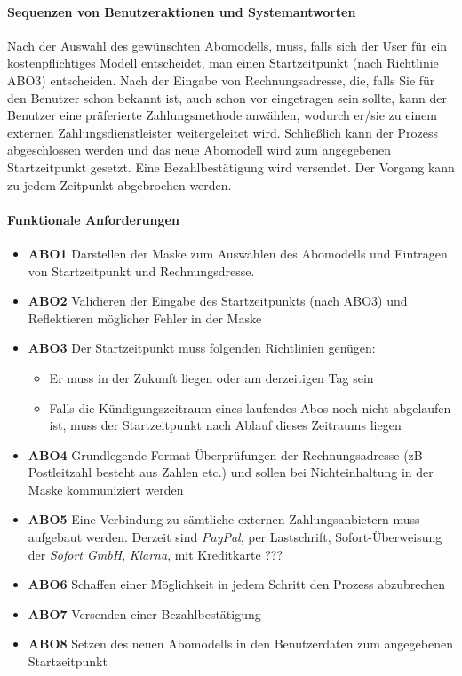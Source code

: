 \paragraph{Sequenzen von Benutzeraktionen und Systemantworten}
Nach der Auswahl des gewünschten Abomodells, muss, falls sich der User für ein kostenpflichtiges Modell entscheidet, man einen Startzeitpunkt (nach Richtlinie ABO3) entscheiden. Nach der Eingabe von Rechnungsadresse, die, falls Sie für den Benutzer schon bekannt ist, auch schon vor eingetragen sein sollte, kann der Benutzer eine präferierte Zahlungsmethode anwählen, wodurch er/sie zu einem externen Zahlungsdienstleister weitergeleitet wird. Schließlich kann der Prozess abgeschlossen werden und das neue Abomodell wird zum angegebenen Startzeitpunkt gesetzt. Eine Bezahlbestätigung wird versendet. Der Vorgang kann zu jedem Zeitpunkt abgebrochen werden.

\paragraph{Funktionale Anforderungen}
\begin{itemize}
	\item \textbf{ABO1} Darstellen der Maske zum Auswählen des Abomodells und Eintragen von Startzeitpunkt und Rechnungsdresse.
	\item \textbf{ABO2} Validieren der Eingabe des Startzeitpunkts (nach ABO3) und Reflektieren möglicher Fehler in der Maske
	\item \textbf{ABO3} Der Startzeitpunkt muss folgenden Richtlinien genügen:
	\begin{itemize}
		\item Er muss in der Zukunft liegen oder am derzeitigen Tag sein
		\item Falls die Kündigungszeitraum eines laufendes Abos noch nicht abgelaufen ist, muss der Startzeitpunkt nach Ablauf dieses Zeitraums liegen
	\end{itemize}
	\item \textbf{ABO4} Grundlegende Format-Überprüfungen der Rechnungsadresse (zB Postleitzahl besteht aus Zahlen etc.) und sollen bei Nichteinhaltung in der Maske kommuniziert werden
	\item \textbf{ABO5} Eine Verbindung zu sämtliche externen Zahlungsanbietern muss aufgebaut werden. Derzeit sind \textit{PayPal}, per Lastschrift, Sofort-Überweisung der \textit{Sofort GmbH}, \textit{Klarna}, mit Kreditkarte ???
	\item \textbf{ABO6} Schaffen einer Möglichkeit in jedem Schritt den Prozess abzubrechen
	\item \textbf{ABO7} Versenden einer Bezahlbestätigung
	\item \textbf{ABO8} Setzen des neuen Abomodells in den Benutzerdaten zum angegebenen Startzeitpunkt
\end{itemize}

